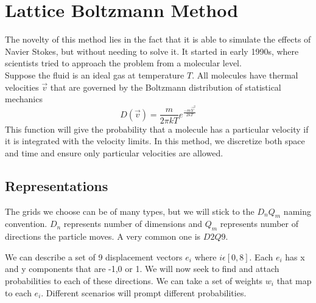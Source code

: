 \documentclass[12pt]{article}
\begin{document}
\section{Lattice Boltzmann Method}
The novelty of this method lies in the fact that it is able to simulate the effects of Navier Stokes, but without needing to solve it. It started in early 1990s, where scientists tried to approach the problem from a molecular level. \\

Suppose the fluid is an ideal gas at temperature $T$. All molecules have thermal velocities $\Vec{v}$ that are governed by the Boltzmann distribution of statistical mechanics \cite{bib11}\cite{bib12}
\begin{equation}
    D(\vec{v}) = \frac{m}{2\pi k T} e^{\frac{-m \vec{V}^{2}}{2kT}}
\end{equation}
This function will give the probability that a molecule has a particular velocity if it is integrated with the velocity limits. In this method, we discretize both space and time and ensure only particular velocities are allowed. \\
\subsection{Representations}
The grids we choose can be of many types, but we will stick to the $D_{n} Q_{m}$ naming convention. $D_{n}$ represents number of dimensions and $Q_{m}$ represents number of directions the particle moves. A very common one is $D2Q9$. \\

\begin{center}
\end{center}
We can describe a set of 9 displacement vectors $e_{i}$ where $i \epsilon [0,8]$. Each $e_{i}$ has x and y components that are -1,0 or 1. We will now seek to find and attach probabilities to each of these directions. We can take a set of weights $w_{i}$ that map to each $e_{i}$. Different scenarios will prompt different probabilities. 
\end{document}
